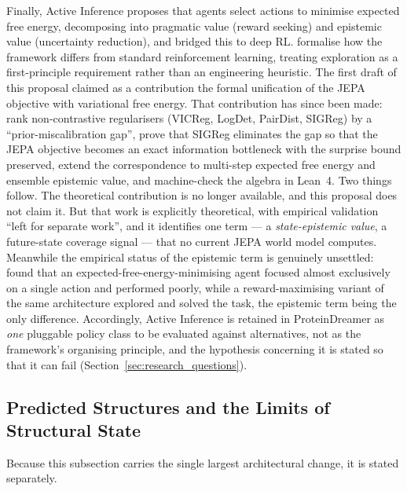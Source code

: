 \documentclass[12pt, a4paper]{article}
\begin{document}
Finally, Active Inference \citep{parr2022active} proposes that agents select actions to minimise expected free energy, decomposing into pragmatic value (reward seeking) and epistemic value (uncertainty reduction), and \citet{tschantz2020rl_active_inference} bridged this to deep RL. \citet{sajid2021demystified} formalise how the framework differs from standard reinforcement learning, treating exploration as a first-principle requirement rather than an engineering heuristic. The first draft of this proposal claimed as a contribution the formal unification of the JEPA objective with variational free energy. That contribution has since been made: \citet{arnez2026sigregfree} rank non-contrastive regularisers (VICReg, LogDet, PairDist, SIGReg) by a ``prior-miscalibration gap'', prove that SIGReg eliminates the gap so that the JEPA objective becomes an exact information bottleneck with the surprise bound preserved, extend the correspondence to multi-step expected free energy and ensemble epistemic value, and machine-check the algebra in Lean~4. Two things follow. The theoretical contribution is no longer available, and this proposal does not claim it. But that work is explicitly theoretical, with empirical validation ``left for separate work'', and it identifies one term --- a \textit{state-epistemic value}, a future-state coverage signal --- that no current JEPA world model computes. Meanwhile the empirical status of the epistemic term is genuinely unsettled: \citet{champion2023deconstructing} found that an expected-free-energy-minimising agent focused almost exclusively on a single action and performed poorly, while a reward-maximising variant of the same architecture explored and solved the task, the epistemic term being the only difference. Accordingly, Active Inference is retained in ProteinDreamer as \textit{one} pluggable policy class to be evaluated against alternatives, not as the framework's organising principle, and the hypothesis concerning it is stated so that it can fail (Section~\ref{sec:research_questions}).

\subsection{Predicted Structures and the Limits of Structural State}
\label{sec:structure_limits}

Because this subsection carries the single largest architectural change, it is stated separately.
\end{document}
